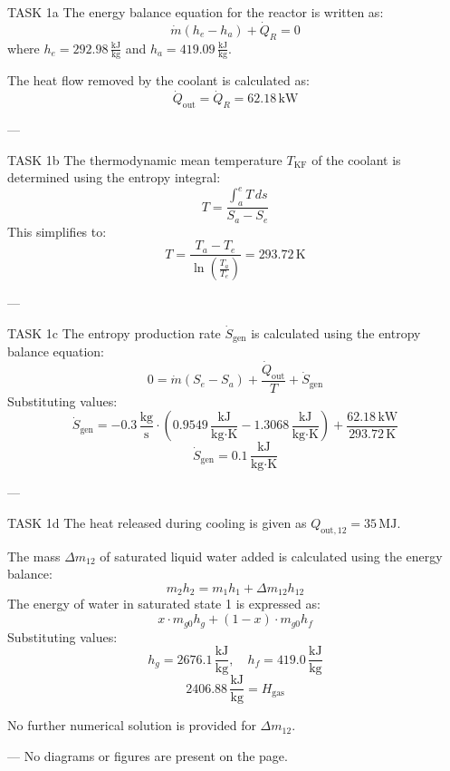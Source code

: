 TASK 1a  
The energy balance equation for the reactor is written as:  
\[
\dot{m}(h_e - h_a) + \dot{Q}_R = 0
\]  
where \( h_e = 292.98 \, \frac{\text{kJ}}{\text{kg}} \) and \( h_a = 419.09 \, \frac{\text{kJ}}{\text{kg}} \).  

The heat flow removed by the coolant is calculated as:  
\[
\dot{Q}_{\text{out}} = \dot{Q}_R = 62.18 \, \text{kW}
\]  

---

TASK 1b  
The thermodynamic mean temperature \( T_{\text{KF}} \) of the coolant is determined using the entropy integral:  
\[
T = \frac{\int_a^e T \, ds}{S_a - S_e}
\]  
This simplifies to:  
\[
T = \frac{T_a - T_e}{\ln\left(\frac{T_a}{T_e}\right)} = 293.72 \, \text{K}
\]  

---

TASK 1c  
The entropy production rate \( \dot{S}_{\text{gen}} \) is calculated using the entropy balance equation:  
\[
0 = \dot{m}(S_e - S_a) + \frac{\dot{Q}_{\text{out}}}{T} + \dot{S}_{\text{gen}}
\]  
Substituting values:  
\[
\dot{S}_{\text{gen}} = -0.3 \, \frac{\text{kg}}{\text{s}} \cdot (0.9549 \, \frac{\text{kJ}}{\text{kg·K}} - 1.3068 \, \frac{\text{kJ}}{\text{kg·K}}) + \frac{62.18 \, \text{kW}}{293.72 \, \text{K}}
\]  
\[
\dot{S}_{\text{gen}} = 0.1 \, \frac{\text{kJ}}{\text{kg·K}}
\]  

---

TASK 1d  
The heat released during cooling is given as \( Q_{\text{out},12} = 35 \, \text{MJ} \).  

The mass \( \Delta m_{12} \) of saturated liquid water added is calculated using the energy balance:  
\[
m_2 h_2 = m_1 h_1 + \Delta m_{12} h_{12}
\]  
The energy of water in saturated state 1 is expressed as:  
\[
x \cdot m_{g0} h_g + (1-x) \cdot m_{g0} h_f
\]  
Substituting values:  
\[
h_g = 2676.1 \, \frac{\text{kJ}}{\text{kg}}, \quad h_f = 419.0 \, \frac{\text{kJ}}{\text{kg}}
\]  
\[
2406.88 \, \frac{\text{kJ}}{\text{kg}} = H_{\text{gas}}
\]  

No further numerical solution is provided for \( \Delta m_{12} \).  

---  
No diagrams or figures are present on the page.